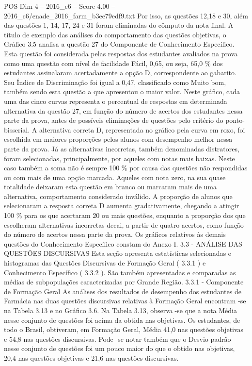 \begin{textsample}{POS Dim 4 – 2016\_c6 – Score 4.00 – 2016\_c6/enade\_2016\_farm\_b3ee79edf9.txt}
Por isso, as questões 12,18 e 30, além das questões 1, 14, 17, 24 e 31 foram eliminadas do cômputo da nota final.
A título de exemplo das análises do comportamento das questões objetivas, o Gráfico 3.5 analisa a questão 27 do Componente de Conhecimento Específico.
Esta questão foi considerada pelas respostas dos estudantes avaliados na prova como uma questão com nível de facilidade Fácil, 0,65, ou seja, 65,0 \% dos estudantes assinalaram acertadamente a opção D, correspondente ao gabarito.
Seu Índice de Discriminação foi igual a 0,47, classificado como Muito bom, também sendo esta questão a que apresentou o maior valor.
Neste gráfico, cada uma das cinco curvas representa o percentual de respostas em determinada alternativa da questão 27, em função do número de acertos dos estudantes nessa parte da prova, antes de possíveis eliminações de questões pelo critério do ponto-bisserial.
A alternativa correta D, representada no gráfico pela curva em roxo, foi escolhida em maiores proporções pelos alunos com desempenho melhor nessa parte da prova.
Já as alternativas incorretas, também denominadas distratores, foram selecionadas, principalmente, por aqueles com notas mais baixas.
Neste caso também a soma não é sempre 100 \% por causa das questões não respondidas ou com mais de uma opção marcada.
Aqueles com nota zero, na sua quase totalidade deixaram esta questão em branco ou marcaram mais de uma alternativa, comportamento considerado inválido.
A proporção de alunos que selecionaram a resposta correta D aumenta gradativamente, chegando a atingir 100 \% para os que acertaram 20 ou mais questões, enquanto a proporção dos que escolheram alternativas incorretas decai, a partir de quatro acertos, como função do número de acertos nessa parte da prova.
Os gráficos relativos às demais questões do Conhecimento Específico constam do Anexo I. 3.3 - ANÁLISE DAS QUESTÕES DISCURSIVAS Esta seção apresenta estatísticas selecionadas e histogramas das Questões Discursivas de Formação Geral ( 3.3.1 ) e Conhecimento Específico ( 3.3.2 ).
São também apresentadas e comparadas as médias de subpopulações caracterizadas por Grande Região. 3.3.1 - Componente de Formação Geral As análises dos resultados de desempenho dos estudantes de Farmácia nas duas questões discursivas relativas à Formação Geral encontram -se na Tabela 3.13 e no Gráfico 3.6.
Na Tabela 3.13, observa -se que a nota Média nesse conjunto de questões foi acima da obtida nas objetivas.
Os estudantes, de todo o Brasil, obtiveram, em Formação Geral, Média 41,0 nas questões objetivas e 54,8 nas questões discursivas.
Pode -se notar também que o Desvio padrão nesse conjunto de questões foi um pouco maior do que o obtido nas objetivas, 20,4 nas questões objetivas e 21,6 nas questões discursivas.

\end{textsample}
